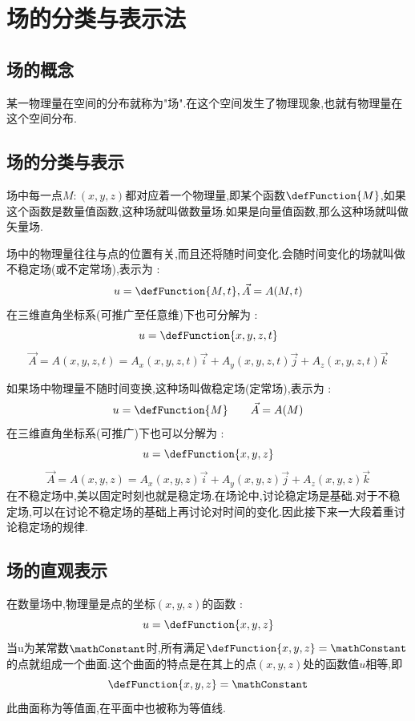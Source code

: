 {{{   }%

  \section{场的分类与表示法}{

    \subsection{场的概念}{
      某一物理量在空间的分布就称为"场".在这个空间发生了物理现象,也就有物理量在这个空间分布.
    }%

    \subsection{场的分类与表示}{
      场中每一点$M:(x,y,z)$都对应着一个物理量,即某个函数$\defFunction{M}$,如果这个函数是数量值函数,这种场就叫做数量场.如果是向量值函数,那么这种场就叫做矢量场.

      场中的物理量往往与点的位置有关,而且还将随时间变化.会随时间变化的场就叫做不稳定场(或不定常场),表示为 :
      $$
        u= \defFunction{M,t},\vec{A} = A(M,t)
      $$
      在三维直角坐标系(可推广至任意维)下也可分解为 :
      $$
        u = \defFunction{x,y,z,t}
      $$
      $$
        \vec{A} = A(x,y,z,t) = A_x(x,y,z,t)\vec{i} + A_y(x,y,z,t)\vec{j} + A_z(x,y,z,t)\vec{k}
      $$\spaceline

      如果场中物理量不随时间变换,这种场叫做稳定场(定常场),表示为 :
      $$
        u= \defFunction{M}\qquad \vec{A} = A(M)
      $$
      在三维直角坐标系(可推广)下也可以分解为 :
      $$
        u= \defFunction{x,y,z}
      $$
      $$
        \vec{A} = A(x,y,z) = A_x(x,y,z)\vec{i} + A_y(x,y,z)\vec{j} + A_z(x,y,z)\vec{k}
      $$
      在不稳定场中,美以固定时刻也就是稳定场.在场论中,讨论稳定场是基础.对于不稳定场,可以在讨论不稳定场的基础上再讨论对时间的变化.因此接下来一大段着重讨论稳定场的规律.
    }%

    \subsection{场的直观表示}{
      在数量场中,物理量是点的坐标$(x,y,z)$的函数 :
      $$
        u = \defFunction{x,y,z}
      $$
      当u为某常数$\mathConstant$时,所有满足$\defFunction{x,y,z} = \mathConstant$的点就组成一个曲面.这个曲面的特点是在其上的点$(x,y,z)$处的函数值$u$相等,即
      $$
        \defFunction{x,y,z} = \mathConstant
      $$
      此曲面称为等值面,在平面中也被称为等值线.

}}}}
